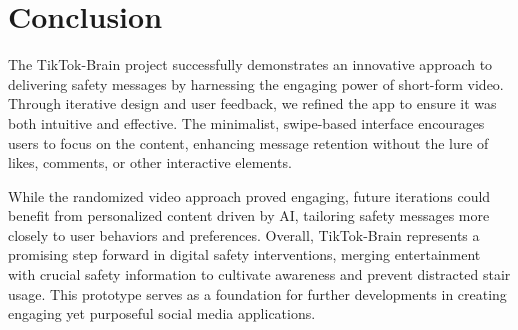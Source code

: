 \documentclass{article}
\begin{document}
\section{Conclusion}
The TikTok-Brain project successfully demonstrates an innovative approach
to delivering safety messages by harnessing the engaging power of short-form video.
Through iterative design and user feedback, we refined the app to ensure it was both intuitive and effective.
The minimalist, swipe-based interface encourages users to focus on the content,
enhancing message retention without the lure of likes, comments, or other interactive elements.

While the randomized video approach proved engaging,
future iterations could benefit from personalized content driven by AI,
tailoring safety messages more closely to user behaviors and preferences.
Overall, TikTok-Brain represents a promising step forward in digital safety interventions,
merging entertainment with crucial safety information to cultivate awareness and prevent distracted stair usage.
This prototype serves as a foundation for further developments in creating engaging yet purposeful social media applications.

% 
% 



\end{document}
